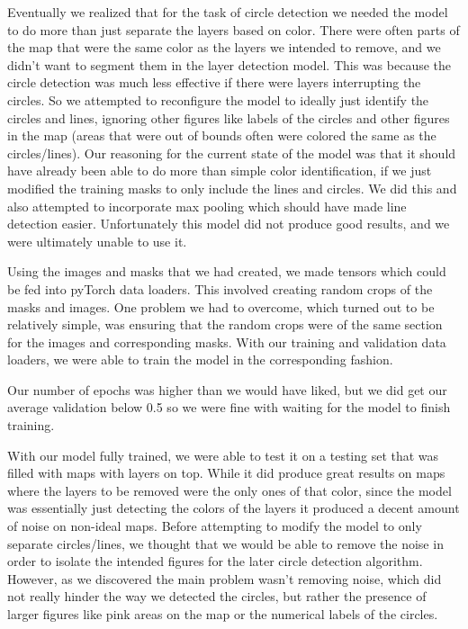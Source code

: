 \documentclass[a4paper,12pt]{extarticle}
\begin{document}
Eventually we realized that for the task of circle detection we needed the model to do more than just separate the layers based on color.
There were often parts of the map that were the same color as the layers we intended to remove, and we didn't want to segment them in the layer detection model.
This was because the circle detection was much less effective if there were layers interrupting the circles.
So we attempted to reconfigure the model to ideally just identify the circles and lines, ignoring other figures like labels of the circles and other figures in the map (areas that were out of bounds often were colored the same as the circles/lines).
Our reasoning for the current state of the model was that it should have already been able to do more than simple color identification, if we just modified the training masks to only include the lines and circles.
We did this and also attempted to incorporate max pooling which should have made line detection easier.
Unfortunately this model did not produce good results, and we were ultimately unable to use it.

Using the images and masks that we had created, we made tensors which could be fed into pyTorch data loaders.
This involved creating random crops of the masks and images.
One problem we had to overcome, which turned out to be relatively simple, was ensuring that the random crops were of the same section for the images and corresponding masks.
With our training and validation data loaders, we were able to train the model in the corresponding fashion.

Our number of epochs was higher than we would have liked, but we did get our average validation below 0.5 so we were fine with waiting for the model to finish training.

With our model fully trained, we were able to test it on a testing set that was filled with maps with layers on top.
While it did produce great results on maps where the layers to be removed were the only ones of that color, since the model was essentially just detecting the colors of the layers it produced a decent amount of noise on non-ideal maps.
Before attempting to modify the model to only separate circles/lines, we thought that we would be able to remove the noise in order to isolate the intended figures for the later circle detection algorithm.
However, as we discovered the main problem wasn’t removing noise, which did not really hinder the way we detected the circles, but rather the presence of larger figures like pink areas on the map or the numerical labels of the circles. 
\end{document}
